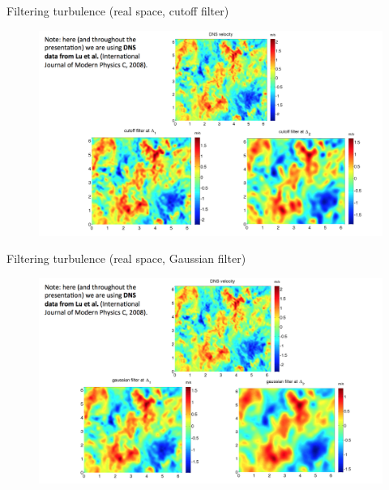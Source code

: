 \begin{frame}{Filtering turbulence (real space, cutoff filter)}
\begin{figure}
	\includegraphics[width=1\textwidth]{filter_cutoff.png}
\end{figure}
\end{frame}

\begin{frame}{Filtering turbulence (real space, Gaussian filter)}
\begin{figure}
	\includegraphics[width=1\textwidth]{filter_gaussian.png}
\end{figure}
\end{frame}

